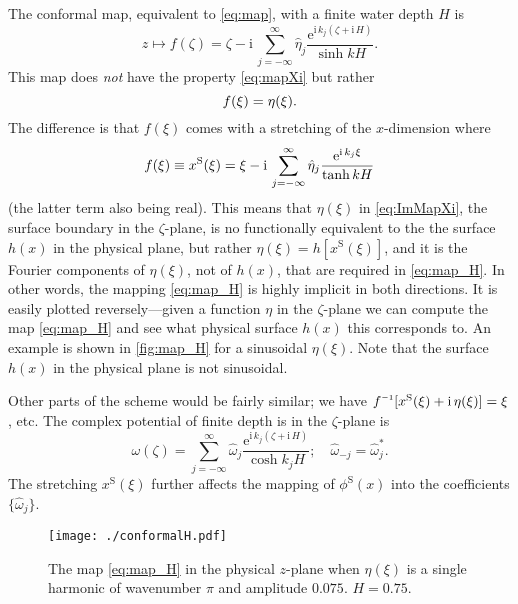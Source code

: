 \documentclass[a4paper,12pt]{article}
\newcommand{\mr}{\mathrm}
\renewcommand{\S}{^\mr{S}}
\newcommand{\ii}{\mr{i}\,}
\newcommand{\ee}{\mr{e}}
\renewcommand{\_}[1]{_\mr{#1}}
\let\Re\relax
\let\Im\relax
\DeclareMathOperator\Re{Re}
\DeclareMathOperator\Im{Im}
\newcommand{\h}{\hat}
\newcommand{\z}{z}
\newcommand{\x}{x}
\newcommand{\zz}{\zeta}
\newcommand{\xx}{\xi}
\newcommand{\zmap}{f}
\newcommand{\zzmap}{\zmap^{\raisebox{.2ex}{$\scriptscriptstyle-1$}}}
\newcommand{\ww}{\omega}
\newcommand{\surf}{\eta}
\begin{document}
The conformal map, equivalent to \eqref{eq:map}, with a finite water depth $H$ is
\begin{equation}
z\mapsto \zmap(\zz) = \zz - \ii \sum_{j=-\infty}^\infty \h\eta_j \frac{\ee^{\ii k_j(\zz+\ii H)}}{\sinh kH}.
\label{eq:map_H}
\end{equation}
This map does \textit{not} have the property \eqref{eq:mapXi} but rather
\begin{equation}
\Im \zmap(\xx) = \surf(\xx).
\label{eq:ImMapXi}
\end{equation}
The difference is that $\zmap(\xx)$ comes with a stretching of the $x$-dimension where
\begin{equation}
\Re \zmap(\xx) \equiv x\S(\xx) = \xx -\ii  \sum_{j=-\infty}^\infty \h\eta_j \frac{\ee^{\ii k_j\xx}}{\tanh kH}
\label{eq:mapXi}
\end{equation}
(the latter term also being real).
This means that $\surf(\xx)$ in \eqref{eq:ImMapXi}, the surface boundary in the $\zz$-plane, is no functionally equivalent to the the surface $h(\x)$ in the physical plane, but rather
$\eta(\xx)=h[x\S(\xx)]$, and it is the Fourier components of $\eta(\xx)$, not of $h(\x)$, that are required in \eqref{eq:map_H}.
In other words, the mapping \eqref{eq:map_H} is highly implicit in both directions.
It is easily plotted reversely---given a function $\eta$ in the $\zz$-plane we can compute the map \eqref{eq:map_H} and see what physical surface $h(x)$ this corresponds to.
An example is shown in \autoref{fig:map_H} for a sinusoidal $\eta(\xx)$. Note that the surface $h(x)$ in the physical plane is not sinusoidal.

Other parts of the scheme would be fairly similar; we have $\zzmap[x\S(\xx)+\ii\eta(\xx)]=\xx$, etc.
The complex potential of finite depth is in the $\zz$-plane is
\begin{equation}
\ww(\zz) = \sum_{j=-\infty}^\infty\h\ww_j \frac{\ee^{\ii k_j(\zz+\ii H)}}{\cosh k_j H}; \quad \h\ww_{-j}=\h\ww_{j}^*.
\label{eq:wH}
\end{equation}
The stretching $x\S(\xx)$ further affects the mapping of $\phi\S(\x)$ into the coefficients $\{\h\ww_j\}$.

\begin{figure}[h!ptb]%
\centering
\texttt{[image: ./conformalH.pdf]}%
\caption{The map \eqref{eq:map_H} in the physical $\z$-plane when $\eta(\xx)$ is a single harmonic of wavenumber $\pi$ and amplitude $0.075$. $H=0.75$.}%
\label{fig:map_H}%
\end{figure}
\end{document}
